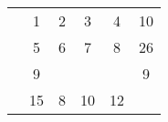 \documentclass{article}
\begin{document}
\begin{tabular}{|c|c|c|c|c|c|}\hline
 & & & & & \\
\hline
 & 1 & 2 & 3 & 4 & 10\\
\hline
 & 5 & 6 & 7 & 8 & 26\\
\hline
 & 9 &  &  &  & 9\\
\hline
 & 15 & 8 & 10 & 12 & \\
\hline
\end{tabular}
\end{document}
